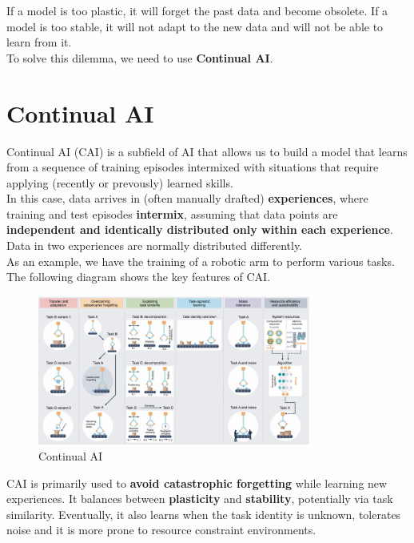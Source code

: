 If a model is too plastic, it will forget the past data and become obsolete. If a model is
too stable, it will not adapt to the new data and will not be able to learn from it.\\

To solve this dilemma, we need to use \textbf{Continual AI}.

\section{Continual AI}

Continual AI (CAI) is a subfield of AI that allows us to build a model that
learns from a sequence of training episodes intermixed with situations that require
applying (recently or prevously) learned skills.\\

In this case, data arrives in (often manually drafted) \textbf{experiences}, where training
and test episodes \textbf{intermix}, assuming that data points are \textbf{independent and
identically distributed only within each experience}. Data in two experiences are normally
distributed differently.\\

As an example, we have the training of a robotic arm to perform various tasks. 
The following diagram shows the key features of CAI.

\begin{figure}[H]
    \centering
    \includegraphics[width=0.8\textwidth]{figures/CAI.png}
    \caption{Continual AI}
    \label{fig:CAI}
\end{figure}

CAI is primarily used to \textbf{avoid catastrophic forgetting} while learning new 
experiences. It balances between \textbf{plasticity} and \textbf{stability}, potentially
via task similarity. Eventually, it also learns when the task identity is unknown, 
tolerates noise and it is more prone to resource constraint environments.


